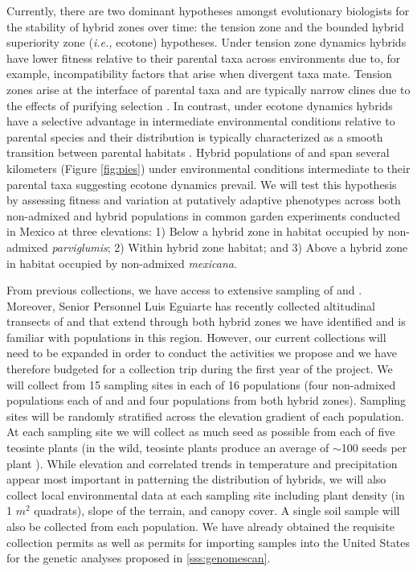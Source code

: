 Currently, there are two dominant hypotheses amongst evolutionary biologists for the stability of hybrid zones over time: the tension zone and the bounded hybrid superiority zone (\emph{i.e.,} ecotone) hypotheses.
Under tension zone dynamics hybrids have lower fitness relative to their parental taxa across environments due to, for example, incompatibility factors that arise when divergent taxa mate.
Tension zones arise at the interface of parental taxa and are typically narrow clines due to the effects of purifying selection \citep{abbott2014}.
In contrast, under ecotone dynamics hybrids have a selective advantage in intermediate environmental conditions relative to parental species and their distribution is typically characterized as a smooth transition between parental habitats \citep{abbott2014}.
Hybrid populations of \zp{} and \zm{} span several kilometers (Figure \ref{fig:pies}) under environmental conditions intermediate to their parental taxa suggesting ecotone dynamics prevail.
We will test this hypothesis by assessing fitness and variation at putatively adaptive phenotypes across both non-admixed and hybrid populations in common garden experiments conducted in Mexico at three elevations: 1) Below a hybrid zone in habitat occupied by non-admixed \emph{parviglumis}; 2) Within hybrid zone habitat; and 3) Above a hybrid zone in habitat occupied by non-admixed \emph{mexicana}. 

From previous collections, we have access to extensive sampling of \zm{} and \zp{}.
Moreover, Senior Personnel Luis Eguiarte has recently collected altitudinal transects of \zp{} and \zm{} that extend through both hybrid zones we have identified \citep{Diez2013} and is familiar with populations in this region.
However, our current collections will need to be expanded in order to conduct the activities we propose and we have therefore budgeted for a collection trip during the first year of the project.
We will collect from 15 sampling sites in each of 16 populations (four non-admixed populations each of \zp{} and \zm{} and four populations from both hybrid zones).
Sampling sites will be randomly stratified across the elevation gradient of each population.
At each sampling site we will collect as much seed as possible from each of five teosinte plants (in the wild, teosinte plants produce an average of $\sim$100 seeds per plant \citep{wilkes1967teosinte}). 
While elevation and correlated trends in temperature and precipitation appear most important in patterning the distribution of hybrids, we will also collect local environmental data at each sampling site including plant density (in 1 $m^2$ quadrats), slope of the terrain, and canopy cover.
A single soil sample will also be collected from each population.  
We have already obtained the requisite collection permits as well as permits for importing samples into the United States for the genetic analyses proposed in \ref{sss:genomescan}.

